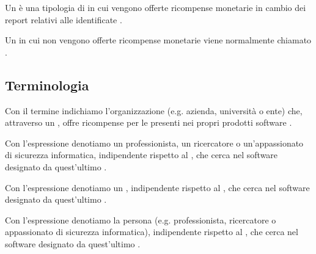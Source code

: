 \begin{definizione}
Un \BBP è una tipologia di \CVD in cui vengono offerte ricompense monetarie in cambio dei report relativi alle \vulnerability identificate \cite{walshe2023bountythesis2, walshe2022cvdpaper, akgul2020bughunters}.
\end{definizione}

\begin{definizione}
Un \CVD in cui non vengono offerte ricompense monetarie viene normalmente chiamato \VDP \cite{walshe2023bountythesis2, walshe2022cvdpaper, akgul2020bughunters}.
\end{definizione}

\subsection{Terminologia}


\begin{definizione}
Con il termine \BI indichiamo l'organizzazione (e.g. azienda, università o ente) che, attraverso un \BBP, offre ricompense per le \vulnerability presenti nei propri prodotti software \cite{canidio2021verioss}.
\end{definizione}

\begin{definizione}
Con l'espressione \BH denotiamo un professionista, un ricercatore o un'appassionato di sicurezza informatica, indipendente rispetto al \BI, che cerca \vulnerability nel software designato da quest'ultimo \cite{canidio2021verioss}. 
\end{definizione}

\begin{definizione}
Con l'espressione \BH denotiamo un \whitehathacker, indipendente rispetto al \BI, che cerca \vulnerability nel software designato da quest'ultimo \cite{canidio2021verioss}. 
\end{definizione}

\begin{definizione}
Con l'espressione \BH denotiamo la persona (e.g. professionista, ricercatore o appassionato di sicurezza informatica), indipendente rispetto al \BI, che cerca \vulnerability nel software designato da quest'ultimo \cite{canidio2021verioss}. 
\end{definizione}

